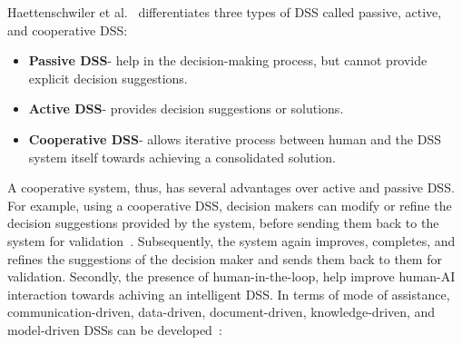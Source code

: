 Haettenschwiler et al.~\cite{haettenschwiler1999neues} differentiates three types of DSS called passive, active, and cooperative DSS:  

\vspace{-2mm}
\begin{itemize}[noitemsep]
    \item \textbf{Passive DSS}- help in the decision-making process, but cannot provide explicit decision suggestions.
    \item \textbf{Active DSS}- provides decision suggestions or solutions. 
    \item \textbf{Cooperative DSS}- allows iterative process between human and the DSS system itself towards achieving a consolidated solution.
\end{itemize}
\vspace{-2mm}

\hspace*{3.5mm} A cooperative system, thus, has several advantages over active and passive DSS. For example, using a cooperative DSS, decision makers can modify or refine the decision suggestions provided by the system, before sending them back to the system for validation~\cite{hackathorn1981organizational}. Subsequently, the system again improves, completes, and refines the suggestions of the decision maker and sends them back to them for validation. Secondly, the presence of human-in-the-loop, help improve human-AI interaction towards achiving an intelligent DSS. In terms of mode of assistance, communication-driven, data-driven, document-driven, knowledge-driven, and model-driven DSSs can be developed~\cite{power2002decision}:

